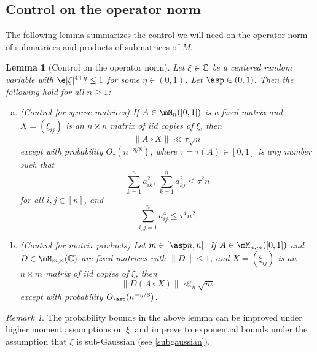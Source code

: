\documentclass[aop,preprint]{imsart}
\theoremstyle{plain}
\newtheorem{lemma}[theorem]{Lemma}
\theoremstyle{definition}
\theoremstyle{remark}
\newtheorem{remark}[theorem]{Remark}
\numberwithin{equation}{section}
\numberwithin{theorem}{section}
\begin{document}
\subsection{Control on the operator norm}		\label{sec:op}

The following lemma summarizes the control we will need on the operator norm of submatrices and products of submatrices of $M$.

\begin{lemma}[Control on the operator norm]	\label{lem:opcontrol}
Let $\xi\in {\mathbb C}$ be a centered random variable with $\e|\xi|^{4+\eta}\le 1$ for some $\eta\in (0,1)$. 
Let $\asp \in (0,1)$. 
Then the following hold for all $n\ge 1$:
\begin{enumerate}[(a)]
\item (Control for sparse matrices) 
If $A\in \mM_n([0,1])$ is a fixed matrix and $X=(\xi_{ij})$ is an $n\times n$ matrix of iid copies of $\xi$, then 
\begin{equation}
\|A \circ X\| \ll \tau \sqrt{n}
\end{equation}
except with probability $O_\tau(n^{-\eta/8})$, where $\tau=\tau(A)\in [0,1]$ is any number such that
\begin{equation}
\sum_{k=1}^n a_{ik}^2, \, \sum_{k=1}^n a_{kj}^2 \le \tau^2 n
\end{equation}
for all $i,j\in [n]$, and 
\begin{equation}	\label{4th.mom.bd}
\sum_{i,j=1}^n a_{ij}^4 \le \tau^4 n^2.
\end{equation}
%

\item (Control for matrix products) 
Let $m\in [\asp n,n]$.
If $A\in \mM_{n,m}([0,1])$ and $D\in \mM_{m, n}(\C)$ are fixed matrices with $\|D\|\le 1$, and $X=(\xi_{ij})$ is an $n\times m$ matrix of iid copies of $\xi$, then 
\begin{equation}	\label{mbp:2}
\|D(A\circ X)\| \ll_\eta %
\sqrt{m}
\end{equation}
except with probability $O_{\asp }(n^{-\eta/8})$.
\end{enumerate}

\end{lemma}

\begin{remark}
The probability bounds in the above lemma can be improved under higher moment assumptions on $\xi$, and improve to exponential bounds under the assumption that $\xi$ is sub-Gaussian (see \eqref{subgaussian}).
\end{remark}
\end{document}
